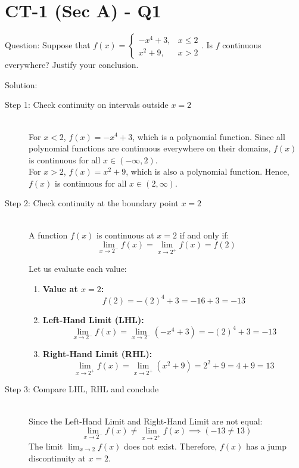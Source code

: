 \documentclass[11pt, a4paper]{article}
\begin{document}

\section*{CT-1 (Sec A) - Q1}

Question:
Suppose that $f(x) = \begin{cases} -x^4 + 3, & x \le 2 \\ x^2 + 9, & x > 2 \end{cases}$. Is $f$ continuous everywhere? Justify your conclusion.

Solution:

\begin{description}
    \item[Step 1: Check continuity on intervals outside $x = 2$] \ \\
    For $x < 2$, $f(x) = -x^4 + 3$, which is a polynomial function. Since all polynomial functions are continuous everywhere on their domains, $f(x)$ is continuous for all $x \in (-\infty, 2)$. \\
    For $x > 2$, $f(x) = x^2 + 9$, which is also a polynomial function. Hence, $f(x)$ is continuous for all $x \in (2, \infty)$.

    \item[Step 2: Check continuity at the boundary point $x = 2$] \ \\
    A function $f(x)$ is continuous at $x = 2$ if and only if:
    \[ \lim_{x \to 2^-} f(x) = \lim_{x \to 2^+} f(x) = f(2) \]
    
    Let us evaluate each value:
    \begin{enumerate}
        \item \textbf{Value at $x = 2$:}
        \[ f(2) = -(2)^4 + 3 = -16 + 3 = -13 \]
        
        \item \textbf{Left-Hand Limit (LHL):}
        \[ \lim_{x \to 2^-} f(x) = \lim_{x \to 2^-} (-x^4 + 3) = -(2)^4 + 3 = -13 \]
        
        \item \textbf{Right-Hand Limit (RHL):}
        \[ \lim_{x \to 2^+} f(x) = \lim_{x \to 2^+} (x^2 + 9) = 2^2 + 9 = 4 + 9 = 13 \]
    \end{enumerate}

    \item[Step 3: Compare LHL, RHL and conclude] \ \\
    Since the Left-Hand Limit and Right-Hand Limit are not equal:
    \[ \lim_{x \to 2^-} f(x) \neq \lim_{x \to 2^+} f(x) \implies (-13 \neq 13) \]
    The limit $\lim_{x \to 2} f(x)$ does not exist. Therefore, $f(x)$ has a jump discontinuity at $x = 2$.
\end{description}
\end{document}
